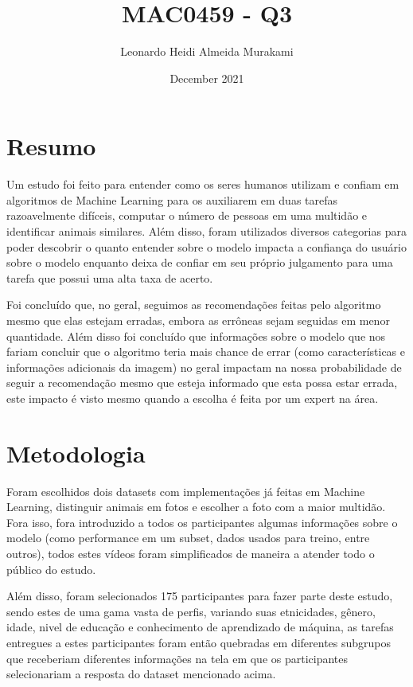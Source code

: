 \documentclass{article}
\title{MAC0459 - Q3}
\author{Leonardo  Heidi Almeida Murakami}
\date{December 2021}
\begin{document}
\maketitle

\section{Resumo}
Um estudo foi feito para entender como os seres humanos utilizam e confiam em algoritmos de Machine Learning para os auxiliarem em duas tarefas razoavelmente difíceis, computar o número de pessoas em uma multidão e identificar animais similares. Além disso, foram utilizados diversos categorias para poder descobrir o quanto entender sobre o modelo impacta a confiança do usuário sobre o modelo enquanto deixa de confiar em seu próprio julgamento para uma tarefa que possui uma alta taxa de acerto. 

Foi concluído que, no geral, seguimos as recomendações feitas pelo algoritmo mesmo que elas estejam erradas, embora as errôneas sejam seguidas em menor quantidade. Além disso foi concluído que informações sobre o modelo que nos fariam concluir que o algoritmo teria mais chance de errar (como características e informações adicionais da imagem) no geral impactam na nossa probabilidade de seguir a recomendação mesmo que esteja informado que esta possa estar errada, este impacto é visto mesmo quando a escolha é feita por um expert na área.

\section{Metodologia}
Foram escolhidos dois datasets com implementações já feitas em Machine Learning, distinguir animais em fotos e escolher a foto com a maior multidão. Fora isso, fora introduzido a todos os participantes algumas informações sobre o modelo (como performance em um subset, dados usados para treino, entre outros), todos estes vídeos foram simplificados de maneira a atender todo o público do estudo.

Além disso, foram selecionados 175 participantes para fazer parte deste estudo, sendo estes de uma gama vasta de perfis, variando suas etnicidades, gênero, idade, nivel de educação e conhecimento de aprendizado de máquina, as tarefas entregues a estes participantes foram então quebradas em diferentes subgrupos que receberiam diferentes informações na tela em que os participantes selecionariam a resposta do dataset mencionado acima.
\end{document}
